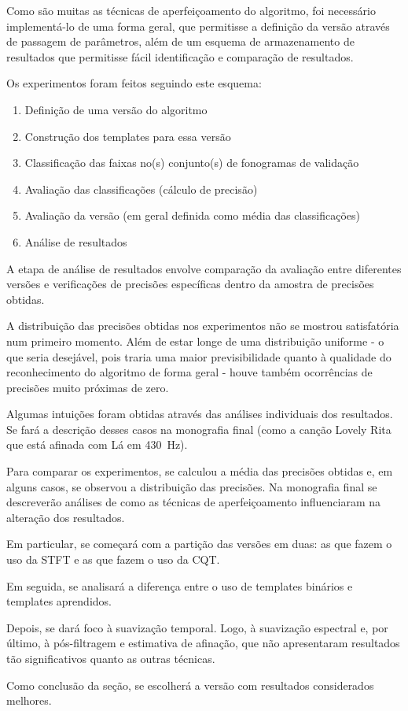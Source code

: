     Como são muitas as técnicas de aperfeiçoamento do algoritmo, foi necessário implementá-lo de uma forma geral, que permitisse a definição da versão através de passagem de parâmetros, além de um esquema de armazenamento de resultados que permitisse fácil identificação e comparação de resultados.
    
    Os experimentos foram feitos seguindo este esquema:
    
    \begin{enumerate}
        \item Definição de uma versão do algoritmo
        \item Construção dos templates para essa versão
        \item Classificação das faixas no(s) conjunto(s) de fonogramas de validação
        \item Avaliação das classificações (cálculo de precisão)
        \item Avaliação da versão (em geral definida como média das classificações)
        \item Análise de resultados
    \end{enumerate}
    
    A etapa de análise de resultados envolve comparação da avaliação entre diferentes versões e verificações de precisões específicas dentro da amostra de precisões obtidas.
    
    A distribuição das precisões obtidas nos experimentos não se mostrou satisfatória num primeiro momento. Além de estar longe de uma distribuição uniforme - o que seria desejável, pois traria uma maior previsibilidade quanto à qualidade do reconhecimento do algoritmo de forma geral - houve também ocorrências de precisões muito próximas de zero.
    
    Algumas intuições foram obtidas através das análises individuais dos resultados. Se fará a descrição desses casos na monografia final (como a canção Lovely Rita que está afinada com Lá em 430~Hz).
    
    Para comparar os experimentos, se calculou a média das precisões obtidas e, em alguns casos, se observou a distribuição das precisões. Na monografia final se descreverão análises de como as técnicas de aperfeiçoamento influenciaram na alteração dos resultados.
    
    Em particular, se começará com a partição das versões em duas: as que fazem o uso da STFT e as que fazem o uso da CQT.
    
    Em seguida, se analisará a diferença entre o uso de templates binários e templates aprendidos.
    
    Depois, se dará foco à suavização temporal. Logo, à suavização espectral e, por último, à pós-filtragem e estimativa de afinação, que não apresentaram resultados tão significativos quanto as outras técnicas.
    
    Como conclusão da seção, se escolherá a versão com resultados considerados melhores.